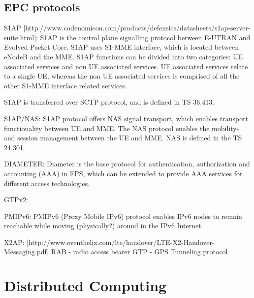 \subsection{EPC protocols}
\label{sec:epc-protocols}
S1AP [http://www.codenomicon.com/products/defensics/datasheets/s1ap-server-suite.html]:
S1AP is the control plane signalling protocol between E-UTRAN and Evolved Packet Core. S1AP uses S1-MME interface, which is located between eNodeB and the MME. S1AP functions can be divided into two categories: UE associated services and non UE associated services. UE associated services relate to a single UE, whereas the non UE associated services is comprised of all the other S1-MME interface related services.

S1AP is transferred over SCTP protocol, and is defined in TS 36.413.

S1AP/NAS:
S1AP protocol offers NAS signal transport, which enables transport functionality between UE and MME. The NAS protocol enables the mobility- and session management between the UE and MME. NAS is defined in the TS 24.301.

DIAMETER:
Diameter is the base protocol for authentication, authorization and accounting (AAA) in EPS, which can be extended to provide AAA services for different access technologies.

GTPv2:

PMIPv6:
PMIPv6 (Proxy Mobile IPv6) protocol enables IPv6 nodes to remain reachable while moving (physically?) around in the IPv6 Internet.

X2AP:
[http://www.eventhelix.com/lte/handover/LTE-X2-Handover-Messaging.pdf]
RAB - radio access bearer
GTP - GPS Tunneling protocol

\section{Distributed Computing}


